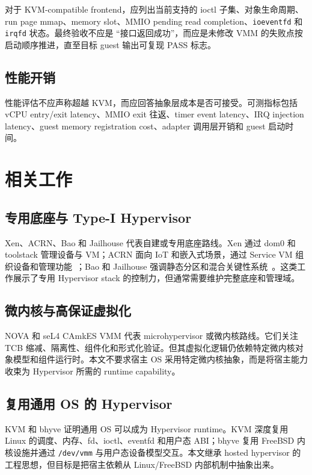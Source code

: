 \documentclass[a4paper,11pt]{article}
\begin{document}
对于 KVM-compatible frontend，应列出当前支持的 ioctl 子集、对象生命周期、run page mmap、memory slot、MMIO pending read completion、\texttt{ioeventfd} 和 \texttt{irqfd} 状态。最终验收不应是 ``接口返回成功''，而应是未修改 VMM 的失败点按启动顺序推进，直至目标 guest 输出可复现 PASS 标志。

\subsection{性能开销}

性能评估不应声称超越 KVM，而应回答抽象层成本是否可接受。可测指标包括 vCPU entry/exit latency、MMIO exit 往返、timer event latency、IRQ injection latency、guest memory registration cost、adapter 调用层开销和 guest 启动时间。

\section{相关工作}

\subsection{专用底座与 Type-I Hypervisor}

Xen、ACRN、Bao 和 Jailhouse 代表自建或专用底座路线。Xen 通过 dom0 和 toolstack 管理设备与 VM；ACRN 面向 IoT 和嵌入式场景，通过 Service VM 组织设备和管理功能~\cite{li2019acrn}；Bao 和 Jailhouse 强调静态分区和混合关键性系统~\cite{martins2020lightweight,martins2023shedding}。这类工作展示了专用 Hypervisor stack 的控制力，但通常需要维护完整底座和管理域。

\subsection{微内核与高保证虚拟化}

NOVA 和 seL4 CAmkES VMM 代表 microhypervisor 或微内核路线。它们关注 TCB 缩减、隔离性、组件化和形式化验证。但其虚拟化逻辑仍依赖特定微内核对象模型和组件运行时。本文不要求宿主 OS 采用特定微内核抽象，而是将宿主能力收束为 Hypervisor 所需的 runtime capability。

\subsection{复用通用 OS 的 Hypervisor}

KVM 和 bhyve 证明通用 OS 可以成为 Hypervisor runtime。KVM 深度复用 Linux 的调度、内存、fd、ioctl、eventfd 和用户态 ABI；bhyve 复用 FreeBSD 内核设施并通过 \texttt{/dev/vmm} 与用户态设备模型交互。本文继承 hosted hypervisor 的工程思想，但目标是把宿主依赖从 Linux/FreeBSD 内部机制中抽象出来。
\end{document}
